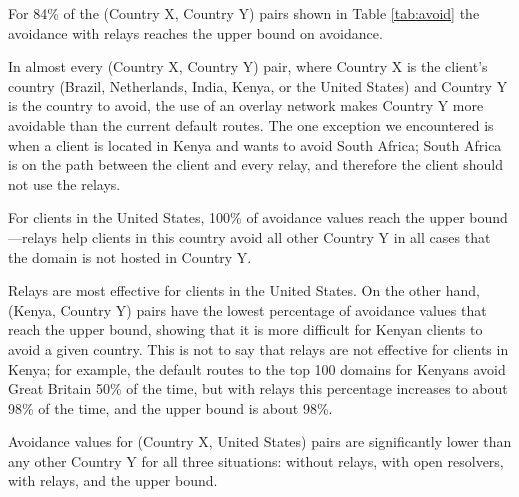 \begin{finding}
For 84\% of the (Country X, Country Y) pairs shown in Table \ref{tab:avoid} the avoidance with relays reaches the upper bound on avoidance. 
\end{finding}
In almost every (Country X, Country Y) pair, where Country X is the client's country (Brazil, Netherlands, India, Kenya, or the United States) and Country Y is the country to avoid, the use of an overlay network makes Country Y more avoidable than the current default routes.  The one exception we encountered is when a client is located in Kenya and wants to avoid South Africa; South Africa is on the path between the client and every relay, and therefore the client should not use the relays.  

\begin{finding}
For clients in the United States, 100\% of avoidance values reach the upper bound---relays help clients in this country avoid all other Country Y in all cases that the domain is not hosted in Country Y.  
\end{finding}
Relays are most effective for clients in the United States.  On the other hand, (Kenya, Country Y) pairs have the lowest percentage of avoidance values that reach the upper bound, showing that it is more difficult for Kenyan clients to avoid a given country.  This is not to say that relays are not effective for clients in Kenya; for example, the default routes to the top 100 domains for Kenyans avoid Great Britain 50\% of the time, but with relays this percentage increases to about 98\% of the time, and the upper bound is about 98\%. 

\begin{finding}
Avoidance values for (Country X, United States) pairs are significantly lower than any other Country Y for all three situations: without relays, with open resolvers, with relays, and the upper bound. 
\end{finding}


